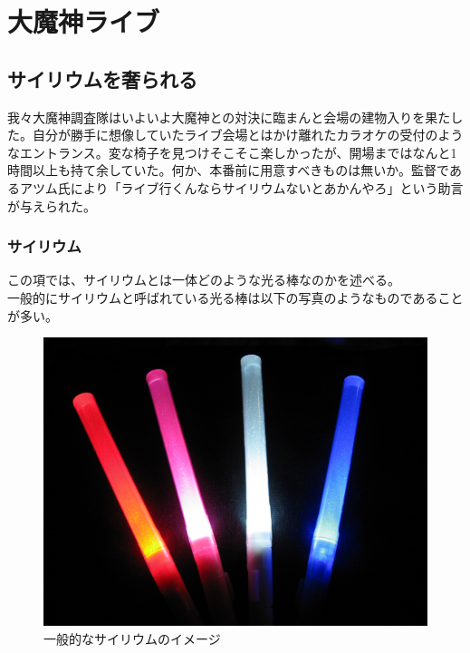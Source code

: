 \section{大魔神ライブ}

\subsection{サイリウムを奢られる}

我々大魔神調査隊はいよいよ大魔神との対決に臨まんと会場の建物入りを果たした。自分が勝手に想像していたライブ会場とはかけ離れたカラオケの受付のようなエントランス。変な椅子を見つけそこそこ楽しかったが、開場まではなんと1時間以上も持て余していた。何か、本番前に用意すべきものは無いか。監督であるアツム氏により「ライブ行くんならサイリウムないとあかんやろ」という助言が与えられた。\\

\subsubsection{サイリウム}

この項では、サイリウムとは一体どのような光る棒なのかを述べる。\\
一般的にサイリウムと呼ばれている光る棒は以下の写真のようなものであることが多い。

\begin{figure}[H]
\centering
\includegraphics[scale=0.3]{./section/sasakiLIVE/figures/penlight.jpg}
\caption{一般的なサイリウムのイメージ}
\label{gen_penlight}
\end{figure}

